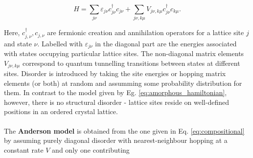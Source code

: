 \documentclass[10pt,a4paper]{article}
\begin{document}
\begin{equation}\label{eq:compositional}
H=\sum\limits_{j\nu}\varepsilon_{j\nu} c^\dagger_{j\nu}c_{j\nu} + \sum\limits_{j\nu,k\mu} V_{j\nu, k\mu}c^\dagger_{j\nu}c_{k\mu}.
\end{equation}
\begin{minipage}[t]{0.5\textwidth} 
Here, $c^\dagger_{j,\nu}, c_{j,\nu}$ are fermionic creation and annihilation operators for a lattice site $j$ and state $\nu$. Labelled with $\varepsilon_{j\nu}$ in the diagonal part are the energies associated with states occupying particular lattice sites. The non-diagonal matrix elements $V_{j\nu, k\mu}$ correspond to quantum tunnelling transitions between states at different sites. Disorder is introduced by taking the site energies or hopping matrix elements (or both) at random and assumming some probability distribution for them. In contrast to the model given by Eg. \eqref{eq:amorphous_hamiltonian}, however, there is no structural disorder - lattice sites reside on well-defined positions in an ordered crystal lattice. \\\\
\noindent The \textbf{Anderson model} is obtained from the one given in Eq. \eqref{eq:compositional} by assuming purely diagonal disorder with 
nearest-neighbour hopping at a constant rate $V$ and only one contributing 
\end{minipage}\hfill
\end{document}
